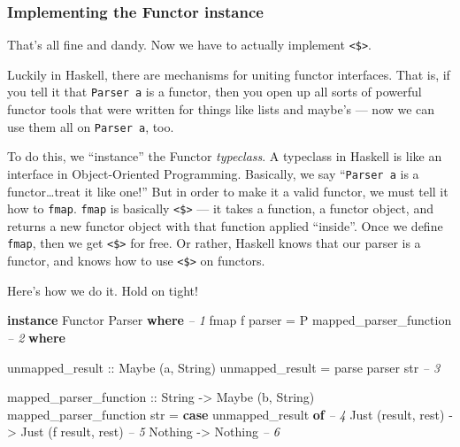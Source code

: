 \documentclass[]{article}
\newenvironment{Shaded}{}{}
\newcommand{\KeywordTok}[1]{\textcolor[rgb]{0.00,0.44,0.13}{\textbf{{#1}}}}
\newcommand{\DataTypeTok}[1]{\textcolor[rgb]{0.56,0.13,0.00}{{#1}}}
\newcommand{\CommentTok}[1]{\textcolor[rgb]{0.38,0.63,0.69}{\textit{{#1}}}}
\newcommand{\OtherTok}[1]{\textcolor[rgb]{0.00,0.44,0.13}{{#1}}}
\newcommand{\FunctionTok}[1]{\textcolor[rgb]{0.02,0.16,0.49}{{#1}}}
\newcommand{\NormalTok}[1]{{#1}}
\begin{document}
\subsubsection{Implementing the Functor instance}\label{implementing-the-functor-instance}

That's all fine and dandy. Now we have to actually implement \texttt{\textless{}\$\textgreater{}}.

Luckily in Haskell, there are mechanisms for uniting functor interfaces. That is, if you tell it
that \texttt{Parser\ a} is a functor, then you open up all sorts of powerful functor tools that were
written for things like lists and maybe's --- now we can use them all on \texttt{Parser\ a}, too.

To do this, we ``instance'' the Functor \emph{typeclass}. A typeclass in Haskell is like an
interface in Object-Oriented Programming. Basically, we say ``\texttt{Parser\ a} is a
functor\ldots{}treat it like one!'' But in order to make it a valid functor, we must tell it how to
\texttt{fmap}. \texttt{fmap} is basically \texttt{\textless{}\$\textgreater{}} --- it takes a
function, a functor object, and returns a new functor object with that function applied ``inside''.
Once we define \texttt{fmap}, then we get \texttt{\textless{}\$\textgreater{}} for free. Or rather,
Haskell knows that our parser is a functor, and knows how to use
\texttt{\textless{}\$\textgreater{}} on functors.

Here's how we do it. Hold on tight!

\begin{Shaded}
\begin{Highlighting}[]
\KeywordTok{instance} \DataTypeTok{Functor} \DataTypeTok{Parser} \KeywordTok{where}                                       \CommentTok{-- 1}
    \NormalTok{fmap f parser }\FunctionTok{=} \DataTypeTok{P} \NormalTok{mapped_parser_function                        }\CommentTok{-- 2}
        \KeywordTok{where}

\OtherTok{            unmapped_result ::} \DataTypeTok{Maybe} \NormalTok{(a, }\DataTypeTok{String}\NormalTok{)}
            \NormalTok{unmapped_result }\FunctionTok{=} \NormalTok{parse parser str                      }\CommentTok{-- 3}

\OtherTok{            mapped_parser_function ::} \DataTypeTok{String} \OtherTok{->} \DataTypeTok{Maybe} \NormalTok{(b, }\DataTypeTok{String}\NormalTok{)}
            \NormalTok{mapped_parser_function str }\FunctionTok{=}
                \KeywordTok{case} \NormalTok{unmapped_result }\KeywordTok{of}                             \CommentTok{-- 4}
                    \DataTypeTok{Just} \NormalTok{(result, rest) }\OtherTok{->} \DataTypeTok{Just} \NormalTok{(f result, rest)    }\CommentTok{-- 5}
                    \DataTypeTok{Nothing}             \OtherTok{->} \DataTypeTok{Nothing}                  \CommentTok{-- 6}
\end{Highlighting}
\end{Shaded}
\end{document}
